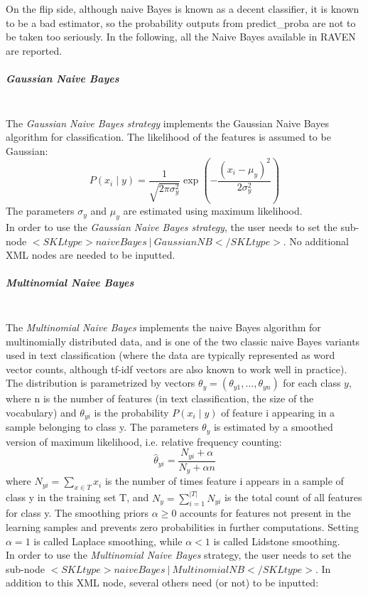 On the flip side, although naive Bayes is known as a decent classifier, it is known to be a bad estimator, so the probability outputs from predict\_proba are not to be taken too seriously.
In the following, all the Naive Bayes available in RAVEN are reported.
\subparagraph{Gaussian Naive Bayes}
\mbox{}
\\The \textit{Gaussian Naive Bayes strategy} implements the Gaussian Naive Bayes algorithm for classification. The likelihood of the features is assumed to be Gaussian:
\begin{equation}
P(x_i \mid y) = \frac{1}{\sqrt{2\pi\sigma^2_y}} \exp\left(-\frac{(x_i - \mu_y)^2}{2\sigma^2_y}\right)
\end{equation}
The parameters $\sigma_y$ and $\mu_y$ are estimated using maximum likelihood.
\\In order to use the   \textit{Gaussian Naive Bayes strategy}, the user needs to set the sub-node $<SKLtype>naiveBayes~\vert~GaussianNB</SKLtype>$. No additional XML nodes are needed to be inputted.
\subparagraph{Multinomial Naive Bayes}
\mbox{}
\\The \textit{Multinomial Naive Bayes} implements the naive Bayes algorithm for multinomially distributed data, and is one of the two classic naive Bayes variants used in text classification (where the data are typically represented as word vector counts, although tf-idf vectors are also known to work well in practice). The distribution is parametrized by vectors $\theta_y = (\theta_{y1},\ldots,\theta_{yn})$ for each class $y$, where n is the number of features (in text classification, the size of the vocabulary) and $\theta_{yi}$ is the probability $P(x_i \mid y)$ of feature i appearing in a sample belonging to class y.
The parameters $\theta_y$ is estimated by a smoothed version of maximum likelihood, i.e. relative frequency counting:
\begin{equation}
\hat{\theta}_{yi} = \frac{ N_{yi} + \alpha}{N_y + \alpha n}
\end{equation}
where $N_{yi} = \sum_{x \in T} x_i$ is the number of times feature i appears in a sample of class y in the training set T, and $N_{y} = \sum_{i=1}^{|T|} N_{yi}$ is the total count of all features for class y.
The smoothing priors $\alpha \ge 0$ accounts for features not present in the learning samples and prevents zero probabilities in further computations. Setting $\alpha = 1$ is called Laplace smoothing, while $\alpha < 1$ is called Lidstone smoothing.
\\In order to use the   \textit{Multinomial Naive Bayes} strategy, the user needs to set the sub-node $<SKLtype>naiveBayes~\vert~MultinomialNB</SKLtype>$. In addition to this XML node, several others need (or not) to be inputted:
